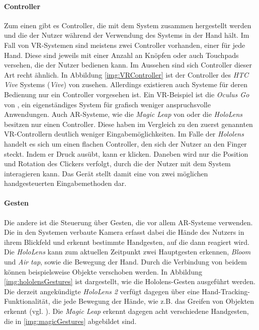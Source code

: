 \paragraph{Controller}
Zum einen gibt es Controller, die mit dem System zusammen hergestellt werden und die der Nutzer während der Verwendung des Systems in der Hand hält. Im Fall von VR-Systemen sind meistens zwei Controller vorhanden, einer für jede Hand. Diese sind jeweils mit einer Anzahl an Knöpfen oder auch Touchpads versehen, die der Nutzer bedienen kann. Im Aussehen sind sich Controller dieser Art recht ähnlich. In Abbildung \ref{img:VRController} ist der Controller des \textit{HTC Vive} Systems (\textit{Vive}) von \cite{vive} zusehen.
Allerdings existieren auch Systeme für deren Bedienung nur ein Controller vorgesehen ist. Ein VR-Beispiel ist die \textit{Oculus Go} von \cite{oculus}, ein eigenständiges System für grafisch weniger anspruchsvolle Anwendungen. 
Auch AR-Systeme, wie die \textit{Magic Leap} von \cite{magicLeap} oder die \textit{HoloLens} besitzen nur einen Controller. Diese haben im Vergleich zu den zuerst genannten VR-Controllern deutlich weniger Eingabemöglichkeiten. Im Falle der \textit{Hololens} handelt es sich um einen flachen Controller, den sich der Nutzer an den Finger steckt. Indem er Druck ausübt, kann er klicken. Daneben wird nur die Position und Rotation des Clickers verfolgt, durch die der Nutzer mit dem System interagieren kann. Das Gerät stellt damit eine von zwei möglichen handgesteuerten Eingabemethoden dar. 

\paragraph{Gesten}
Die andere ist die Steuerung über Gesten, die vor allem AR-Systeme verwenden.
Die in den Systemen verbaute Kamera erfasst dabei die Hände des Nutzers in ihrem Blickfeld und erkennt bestimmte Handgesten, auf die dann reagiert wird. 
Die \textit{HoloLens} kann zum aktuellen Zeitpunkt zwei Hauptgesten erkennen, \textit{Bloom} und \textit{Air tap}, sowie die Bewegung der Hand. Durch die Verbindung von beidem können beispielsweise Objekte verschoben werden. In Abbildung \ref{img:hololensGestures} ist dargestellt, wie die Hololens-Gesten ausgeführt werden. 
Die derzeit angekündigte \textit{HoloLens 2} verfügt dagegen über eine Hand-Tracking-Funktionalität, die jede Bewegung der Hände, wie z.B. das Greifen von Objekten erkennt (vgl. \cite{hololens2}). 
Die \textit{Magic Leap} erkennt dagegen acht verschiedene Handgesten, die in \ref{img:magicGestures} abgebildet sind. 


